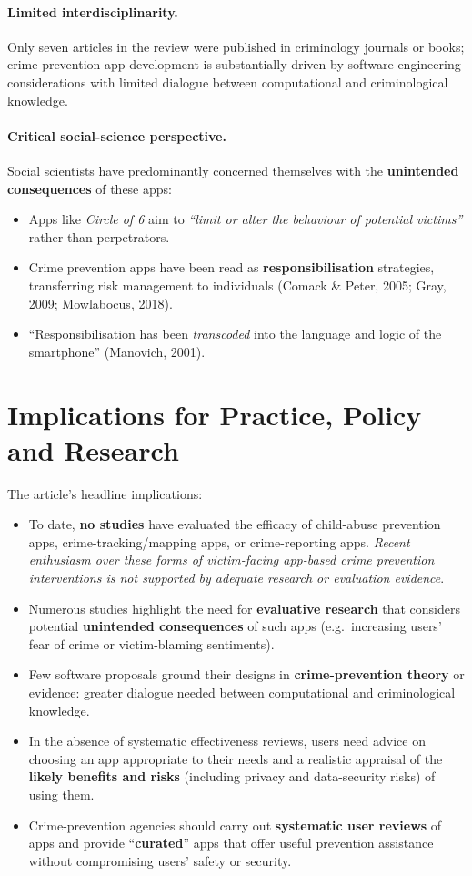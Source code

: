 \documentclass[11pt,a4paper,openany]{report}
\theoremstyle{definition}
\theoremstyle{plain}
\theoremstyle{remark}
\begin{document}
\paragraph{Limited interdisciplinarity.} Only seven articles in the review were published in criminology journals or books; crime prevention app development is substantially driven by software-engineering considerations with limited dialogue between computational and criminological knowledge.

\paragraph{Critical social-science perspective.} Social scientists have predominantly concerned themselves with the \textbf{unintended consequences} of these apps:
\begin{itemize}
    \item Apps like \textit{Circle of 6} aim to \textit{``limit or alter the behaviour of potential victims''} rather than perpetrators.
    \item Crime prevention apps have been read as \textbf{responsibilisation} strategies, transferring risk management to individuals (Comack \& Peter, 2005; Gray, 2009; Mowlabocus, 2018).
    \item ``Responsibilisation has been \textit{transcoded} into the language and logic of the smartphone'' (Manovich, 2001).
\end{itemize}

\section{Implications for Practice, Policy and Research}

The article's headline implications:
\begin{itemize}
    \item To date, \textbf{no studies} have evaluated the efficacy of child-abuse prevention apps, crime-tracking/mapping apps, or crime-reporting apps. \textit{Recent enthusiasm over these forms of victim-facing app-based crime prevention interventions is not supported by adequate research or evaluation evidence}.
    \item Numerous studies highlight the need for \textbf{evaluative research} that considers potential \textbf{unintended consequences} of such apps (e.g.\ increasing users' fear of crime or victim-blaming sentiments).
    \item Few software proposals ground their designs in \textbf{crime-prevention theory} or evidence: greater dialogue needed between computational and criminological knowledge.
    \item In the absence of systematic effectiveness reviews, users need advice on choosing an app appropriate to their needs and a realistic appraisal of the \textbf{likely benefits and risks} (including privacy and data-security risks) of using them.
    \item Crime-prevention agencies should carry out \textbf{systematic user reviews} of apps and provide ``\textbf{curated}'' apps that offer useful prevention assistance without compromising users' safety or security.
\end{itemize}
\end{document}
